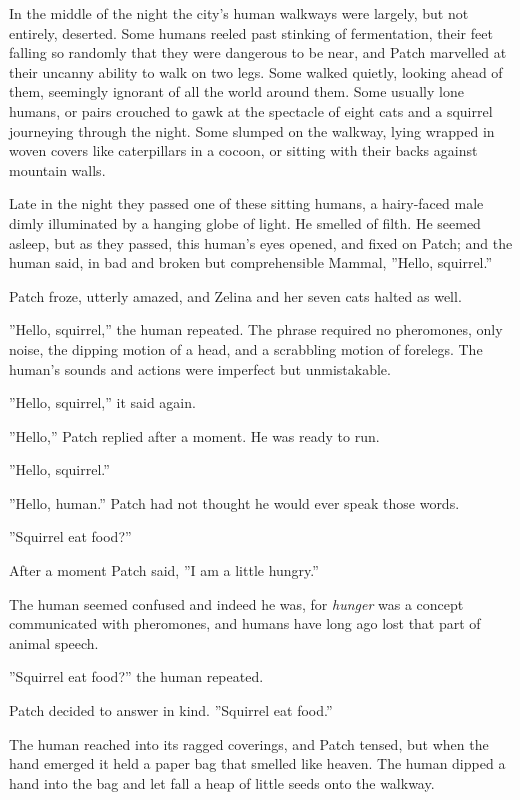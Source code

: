 \documentclass[12pt]{book}
\begin{document}
 In the middle of the night the city's human walkways were largely, but not entirely, deserted. Some humans reeled past stinking of fermentation, their feet falling so randomly that they were dangerous to be near, and Patch marvelled at their uncanny ability to walk on two legs. Some walked quietly, looking ahead of them, seemingly ignorant of all the world around them. Some %
 usually lone humans, or pairs %
 crouched to gawk at the spectacle of eight cats and a squirrel journeying through the night. Some slumped on the walkway, lying wrapped in woven covers like caterpillars in a cocoon, or sitting with their backs against mountain walls.\par
Late in the night they passed one of these sitting humans, a hairy-faced male dimly illuminated by a hanging globe of light. He smelled of filth. He seemed asleep, but as they passed, this human's eyes opened, and fixed on Patch; and the human said, in bad and broken but comprehensible Mammal, ''Hello, squirrel.''\par
Patch froze, utterly amazed, and Zelina and her seven cats halted as well.\par
''Hello, squirrel,'' the human repeated. The phrase required no pheromones, only noise, the dipping motion of a head, and a scrabbling motion of forelegs. The human's sounds and actions were imperfect but unmistakable.\par
''Hello, squirrel,'' it said again.\par
''Hello,'' Patch replied after a moment. He was ready to run.\par
''Hello, squirrel.''\par
''Hello, human.'' Patch had not thought he would ever speak those words.\par
''Squirrel eat food?''\par
After a moment Patch said, ''I am a little hungry.''\par
The human seemed confused %
 and indeed he was, for {\it hunger} was a concept communicated with pheromones, and humans have long ago lost that part of animal speech.\par
''Squirrel eat food?'' the human repeated.\par
Patch decided to answer in kind. ''Squirrel eat food.''\par
The human reached into its ragged coverings, and Patch tensed, but when the hand emerged it held a paper bag that smelled like heaven. The human dipped a hand into the bag and let fall a heap of little seeds onto the walkway.\par
\end{document}
